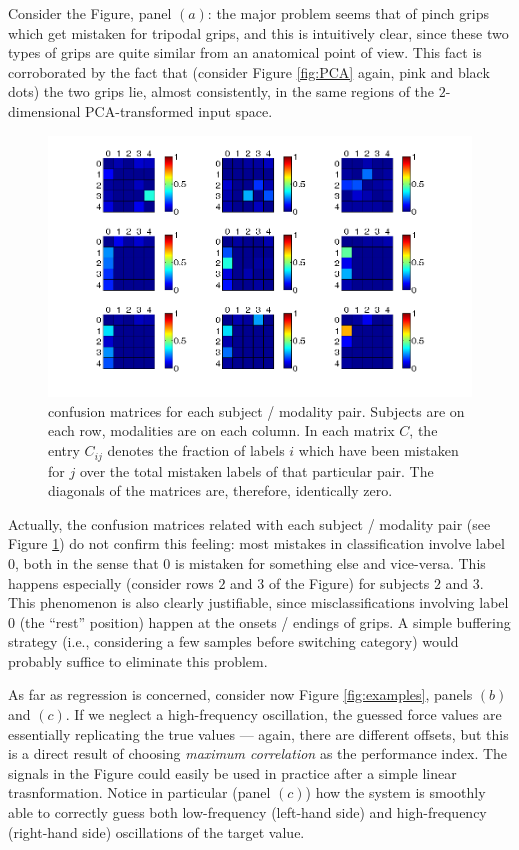 Consider the Figure, panel $(a)$: the major problem seems that of
pinch grips which get mistaken for tripodal grips, and this is
intuitively clear, since these two types of grips are quite similar
from an anatomical point of view. This fact is corroborated by the
fact that (consider Figure \ref{fig:PCA} again, pink and black dots)
the two grips lie, almost consistently, in the same regions of the
$2$-dimensional PCA-transformed input space.

\begin{figure}[!ht] \centering
  \includegraphics[width=\textwidth]{figs/confusion}
  \caption{confusion matrices for each subject / modality
    pair. Subjects are on each row, modalities are on each column. In
    each matrix $C$, the entry $C_{ij}$ denotes the fraction of labels
    $i$ which have been mistaken for $j$ over the total mistaken
    labels of that particular pair. The diagonals of the matrices are,
    therefore, identically zero.}
  \label{fig:confusion}
\end{figure}

Actually, the confusion matrices related with each subject / modality
pair (see Figure \ref{fig:confusion}) do not confirm this feeling:
most mistakes in classification involve label $0$, both in the sense
that $0$ is mistaken for something else and vice-versa. This happens
especially (consider rows $2$ and $3$ of the Figure) for subjects $2$
and $3$.  This phenomenon is also clearly justifiable, since
misclassifications involving label $0$ (the ``rest'' position) happen
at the onsets / endings of grips. A simple buffering strategy (i.e.,
considering a few samples before switching category) would probably
suffice to eliminate this problem.

As far as regression is concerned, consider now Figure
\ref{fig:examples}, panels $(b)$ and $(c)$. If we neglect a
high-frequency oscillation, the guessed force values are essentially
replicating the true values --- again, there are different offsets,
but this is a direct result of choosing \emph{maximum correlation} as
the performance index. The signals in the Figure could easily be used
in practice after a simple linear trasnformation. Notice in particular
(panel $(c)$) how the system is smoothly able to correctly guess both
low-frequency (left-hand side) and high-frequency (right-hand side)
oscillations of the target value.

